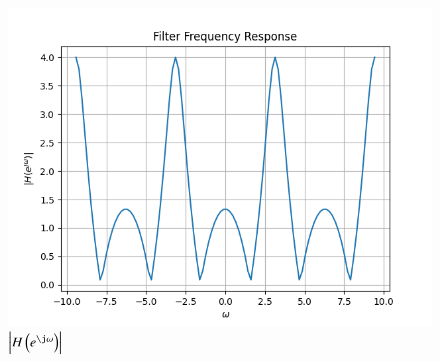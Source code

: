 \documentclass[journal,12pt,twocolumn]{IEEEtran}
\renewcommand\thesection{\arabic{section}}
\begin{document}
\begin{enumerate}[label=\thesection.\arabic*]
\begin{lstlisting}
      \end{lstlisting}
      \begin{figure}[ht!]
        \centering
        \includegraphics[width = \columnwidth]{dtft.png}
        \caption{$\abs{H\brak{e^{\j\omega}}}$}
        \label{DTFT}
      \end{figure} 
    \end{enumerate}
\end{document}
